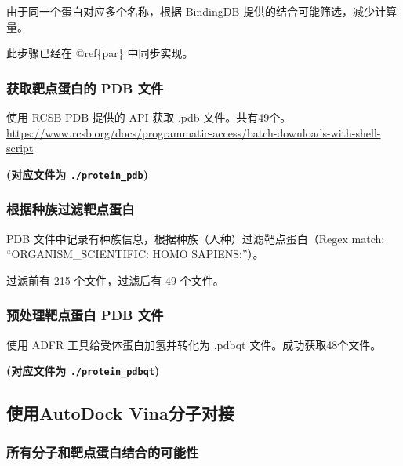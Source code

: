 \documentclass[
]{article}
\begin{document}
由于同一个蛋白对应多个名称，根据 BindingDB 提供的结合可能筛选，减少计算量。

此步骤已经在 @ref\{par\} 中同步实现。

\hypertarget{ux83b7ux53d6ux9776ux70b9ux86cbux767dux7684-pdb-ux6587ux4ef6}{%
\subsubsection{获取靶点蛋白的 PDB 文件}\label{ux83b7ux53d6ux9776ux70b9ux86cbux767dux7684-pdb-ux6587ux4ef6}}

使用 RCSB PDB 提供的 API 获取 .pdb 文件。共有49个。
\url{https://www.rcsb.org/docs/programmatic-access/batch-downloads-with-shell-script}

\textbf{(对应文件为 \texttt{./protein\_pdb})}

\hypertarget{ux6839ux636eux79cdux65cfux8fc7ux6ee4ux9776ux70b9ux86cbux767d}{%
\subsubsection{根据种族过滤靶点蛋白}\label{ux6839ux636eux79cdux65cfux8fc7ux6ee4ux9776ux70b9ux86cbux767d}}

PDB 文件中记录有种族信息，根据种族（人种）过滤靶点蛋白（Regex match: ``ORGANISM\_SCIENTIFIC: HOMO SAPIENS;''）。

过滤前有 215 个文件，过滤后有 49 个文件。

\hypertarget{ux9884ux5904ux7406ux9776ux70b9ux86cbux767d-pdb-ux6587ux4ef6}{%
\subsubsection{预处理靶点蛋白 PDB 文件}\label{ux9884ux5904ux7406ux9776ux70b9ux86cbux767d-pdb-ux6587ux4ef6}}

使用 ADFR 工具给受体蛋白加氢并转化为 .pdbqt 文件。成功获取48个文件。

\textbf{(对应文件为 \texttt{./protein\_pdbqt})}

\hypertarget{ux4f7fux7528autodock-vinaux5206ux5b50ux5bf9ux63a5}{%
\subsection{使用AutoDock Vina分子对接}\label{ux4f7fux7528autodock-vinaux5206ux5b50ux5bf9ux63a5}}

\hypertarget{ux6240ux6709ux5206ux5b50ux548cux9776ux70b9ux86cbux767dux7ed3ux5408ux7684ux53efux80fdux6027}{%
\subsubsection{所有分子和靶点蛋白结合的可能性}\label{ux6240ux6709ux5206ux5b50ux548cux9776ux70b9ux86cbux767dux7ed3ux5408ux7684ux53efux80fdux6027}}
\end{document}

